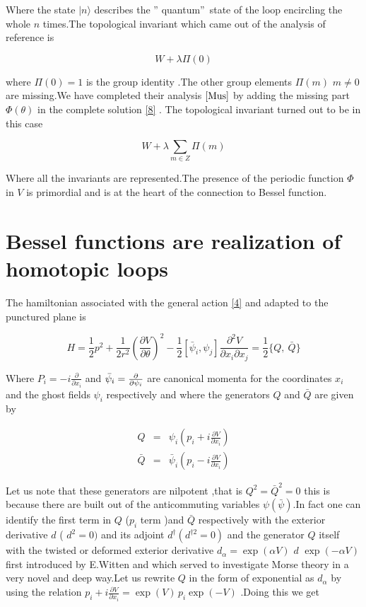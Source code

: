 \documentclass[a4paper,11pt]{article}
\begin{document}
Where the state $\mid n\rangle $ describes the \textquotedblright
quantum\textquotedblright\ state of the loop encircling the whole $n$
times.The topological invariant which came out of the analysis of reference 
\cite{Chamseddine} is

\[
W+\lambda \Pi (0) 
\]

where $\Pi (0)=1$ is the group identity .The other group elements $\Pi (m)$ $%
m\neq 0$ are missing.We have completed their analysis \cite{Wissale} $\cite%
{Mus}$ by adding the missing part $\Phi (\theta )$ in the complete solution %
\ref{8} . The topological invariant turned out to be in this case

\[
W+\lambda \sum_{m\in Z}\Pi (m) 
\]

Where all the invariants are represented.The presence of the periodic
function $\Phi $ in $V$ is primordial and is at the heart of the connection
to Bessel function.

\section{Bessel functions are realization of homotopic loops}

The hamiltonian associated with the general action \ref{4} and adapted to
the punctured plane is

\begin{equation}
H=\frac{1}{2}p^{2}+\frac{1}{2r^{2}}(\frac{\partial V}{\partial \theta })^{2}-%
\frac{1}{2}[\bar{\psi}_{i},\psi _{j}]\frac{\partial ^{2}V}{\partial
x_{i}\partial x_{j}}=\frac{1}{2}\{Q,\ \bar{Q}\}  \nonumber
\end{equation}

Where $P_{i}=-i\frac{\partial }{\partial x_{i}}$ and $\bar{\psi}_{i}=\frac{%
\partial }{\partial \psi _{i}}$ are canonical momenta for the coordinates $%
x_{i}$ and the ghost fields $\psi _{i}$ respectively and where the
generators $Q$ and $\bar{Q}$ are given by

\begin{eqnarray*}
Q &=&\psi _{i}(p_{i}+i\frac{\partial V}{\partial x_{i}}) \\
\bar{Q} &=&\bar{\psi}_{i}(p_{i}-i\frac{\partial V}{\partial x_{i}})
\end{eqnarray*}

Let us note that these generators are nilpotent ,that is $Q^{2}=\bar{Q}%
^{2}=0 $ this is because there are built out of the anticommuting variables $%
\psi (\bar{\psi})$.In fact one can identify the first term in $Q$ ($p_{i}$
term )and $\bar{Q}$ respectively with the exterior derivative $d$ ( $%
d^{2}=0) $ and its adjoint $d^{\dagger }(d^{\dagger 2}=0)$ and the generator 
$Q$ itself with the twisted or deformed exterior derivative $d_{\alpha
}=\exp (\alpha V) $ $d$ $\exp (-\alpha V)$ first introduced by E.Witten \cite%
{Mohsine} and which served to investigate Morse theory in a very novel and
deep way.Let us rewrite $Q$ in the form of exponential as $d_{\alpha }$ by
using the relation $p_{i}+i\frac{\partial V}{\partial x_{i}}=\exp
(V)\,p_{i}\exp (-V)$ .Doing this we get
\end{document}
